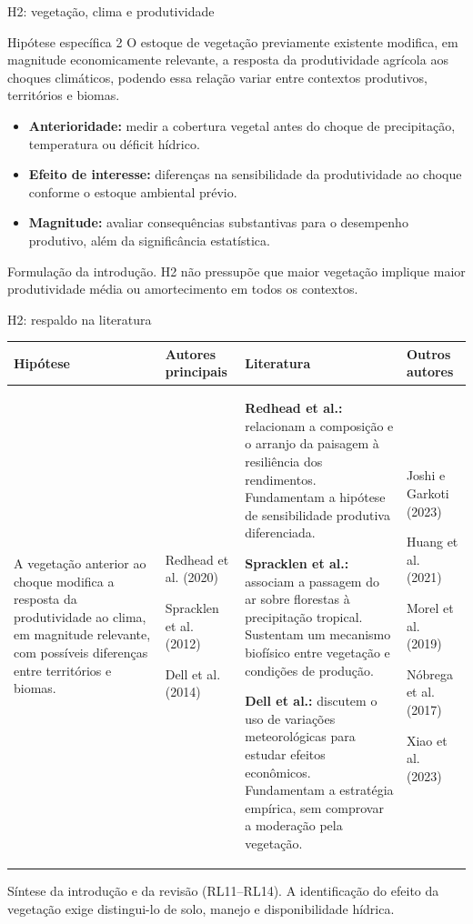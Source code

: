 \documentclass[aspectratio=169,11pt]{beamer}
\newcommand{\fonte}[1]{\par\vfill{\fontsize{7.5}{9}\selectfont\color{gray}#1\par}}
\newcommand{\tpar}{\par\vspace{1.5mm}}
\begin{document}
\begin{frame}{H2: vegetação, clima e produtividade}
\begin{block}{Hipótese específica 2}
O estoque de vegetação previamente existente modifica, em magnitude economicamente relevante, a resposta da produtividade agrícola aos choques climáticos, podendo essa relação variar entre contextos produtivos, territórios e biomas.
\end{block}
\medskip
\begin{itemize}
\item \textbf{Anterioridade:} medir a cobertura vegetal antes do choque de precipitação, temperatura ou déficit hídrico.
\medskip
\item \textbf{Efeito de interesse:} diferenças na sensibilidade da produtividade ao choque conforme o estoque ambiental prévio.
\medskip
\item \textbf{Magnitude:} avaliar consequências substantivas para o desempenho produtivo, além da significância estatística.
\end{itemize}
\fonte{Formulação da introdução. H2 não pressupõe que maior vegetação implique maior produtividade média ou amortecimento em todos os contextos.}
\end{frame}

\begin{frame}{H2: respaldo na literatura}
\fontsize{8.5}{10.6}\selectfont
\setlength{\tabcolsep}{4pt}
\begin{tabularx}{\textwidth}{P{2.6cm} P{2.25cm} X P{2.25cm}}
\toprule
\textbf{Hipótese} & \textbf{Autores principais} & \textbf{Literatura} & \textbf{Outros autores} \\
\midrule
A vegetação anterior ao choque modifica a resposta da produtividade ao clima, em magnitude relevante, com possíveis diferenças entre territórios e biomas.
& Redhead et al. (2020)\tpar Spracklen et al. (2012)\tpar Dell et al. (2014)
& \textbf{Redhead et al.:} relacionam a composição e o arranjo da paisagem à resiliência dos rendimentos. Fundamentam a hipótese de sensibilidade produtiva diferenciada.\tpar
\textbf{Spracklen et al.:} associam a passagem do ar sobre florestas à precipitação tropical. Sustentam um mecanismo biofísico entre vegetação e condições de produção.\tpar
\textbf{Dell et al.:} discutem o uso de variações meteorológicas para estudar efeitos econômicos. Fundamentam a estratégia empírica, sem comprovar a moderação pela vegetação.
& Joshi e Garkoti (2023)\tpar Huang et al. (2021)\tpar Morel et al. (2019)\tpar Nóbrega et al. (2017)\tpar Xiao et al. (2023) \\
\bottomrule
\end{tabularx}
\fonte{Síntese da introdução e da revisão (RL11--RL14). A identificação do efeito da vegetação exige distingui-lo de solo, manejo e disponibilidade hídrica.}
\end{frame}
\end{document}
